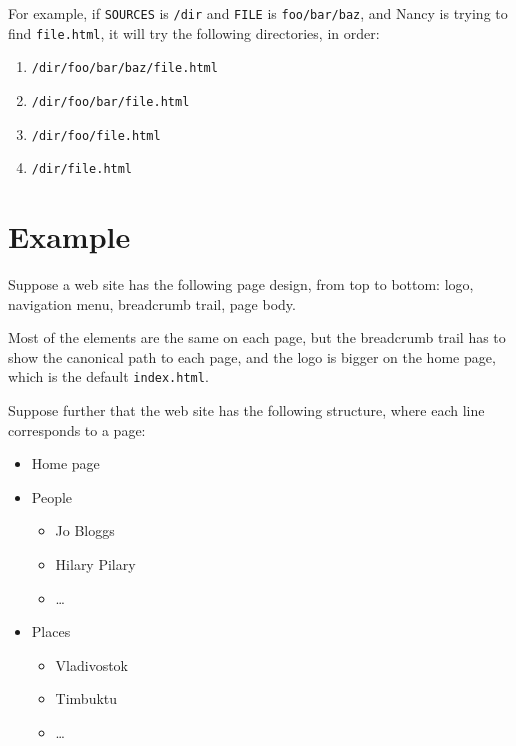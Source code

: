 \documentclass[english]{scrartcl}
\begin{document}
For example, if \verb|SOURCES| is \verb|/dir| and \verb|FILE| is \verb|foo/bar/baz|, and Nancy is trying to find \verb|file.html|, it will try the following directories, in order:

\begin{enumerate}
\item \verb|/dir/foo/bar/baz/file.html|
\item \verb|/dir/foo/bar/file.html|
\item \verb|/dir/foo/file.html|
\item \verb|/dir/file.html|
\end{enumerate}

\section{Example}

Suppose a web site has the following page design, from top to bottom: logo, navigation menu, breadcrumb trail, page body.

Most of the elements are the same on each page, but the breadcrumb trail has to show the canonical path to each page, and the logo is bigger on the home page, which is the default \verb|index.html|.

Suppose further that the web site has the following structure, where each line corresponds to a page:

\begin{itemize}
\item Home page
\item People
  \begin{itemize}
  \item Jo Bloggs
  \item Hilary Pilary
  \item \dots
  \end{itemize}
\item Places
  \begin{itemize}
  \item Vladivostok
  \item Timbuktu
  \item \dots
  \end{itemize}
\end{itemize}
\end{document}
